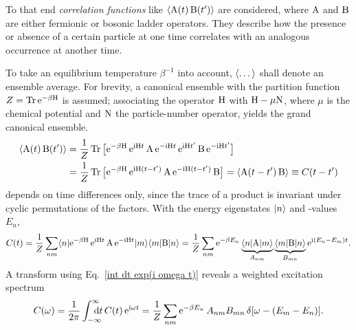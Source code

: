 To that end \emph{correlation functions} like $\langle\mathrm A(t) \, \mathrm B(t')\rangle$ are
considered, where $\mathrm A$ and $\mathrm B$ are either fermionic or bosonic ladder
operators. They describe how the presence or absence of a certain particle at
one time correlates with an analogous occurrence at another time.

To take an equilibrium temperature $\beta^{-1}$ into account, $\langle\dots\rangle$ shall
denote an ensemble average. For brevity, a canonical ensemble with the partition
function $Z = \operatorname{Tr} \mathrm e^{-\beta \mathrm H}$ is assumed; associating the 
operator $\mathrm H$ with $\mathrm H - \mu \mathrm N$, where $\mu$ is the chemical potential
and $\mathrm N$ the particle-number operator, yields the grand canonical ensemble.
%
\begin{equation} \label{C(t)}
    \begin{split}
        \langle\mathrm A(t) \, \mathrm B(t')\rangle &= \frac 1 Z \operatorname{Tr}
        \big[
            \mathrm e^{-\beta \mathrm H} \,
            \mathrm e^{\mathrm i \mathrm H t} \, \mathrm A \, \mathrm e^{-\mathrm i \mathrm H t} \,
            \mathrm e^{\mathrm i \mathrm H t'} \, \mathrm B \, \mathrm e^{-\mathrm i \mathrm H t'}
        \big]
        \\
        &= \frac 1 Z \operatorname{Tr}
        \big[
            \mathrm e^{-\beta \mathrm H} \,
            \mathrm e^{\mathrm i \mathrm H (t - t')} \, \mathrm A \, \mathrm e^{-\mathrm i \mathrm H (t - t')} \, \mathrm B
        \big]
        = \langle\mathrm A(t - t') \, \mathrm B\rangle \equiv C(t - t')
    \end{split}
\end{equation}
%
depends on time differences only, since the trace of a product is invariant
under cyclic permutations of the factors. With the energy eigenstates $|n\rangle$
and -values $E_n$,
%
\begin{equation} \label{C(t) in energy basis}
    C(t) = \frac 1 Z \sum_{n m} \langle n|
    \mathrm e^{-\beta \mathrm H} \, \mathrm e^{\mathrm i \mathrm H t} \, \mathrm A \, \mathrm e^{-\mathrm i \mathrm H t}
    |m\rangle \langle m| \mathrm B |n\rangle =
    \frac 1 Z \sum_{n m} \mathrm e^{-\beta E_n}
    \underbrace{\langle n| \mathrm A |m\rangle}_{A_{n m}}
    \underbrace{\langle m| \mathrm B |n\rangle}_{B_{m n}}
    \mathrm e^{\mathrm i (E_n - E_m) t}.
\end{equation}
%
A  transform using Eq.~\ref{int dt exp(i omega t)} reveals a
weighted excitation spectrum
%
\begin{equation} \label{C(omega)}
    C(\omega) = \frac 1 {2 \pi} \int \from{-\infty} \till \infty \D t \,
    C(t) \, \E^{\I \omega t} =
    \frac 1 Z \sum_{n m} \E^{-\beta E_n} \, A_{n m} B_{m n} \,
    \delta[\omega - (E_m - E_n)].
\end{equation}

